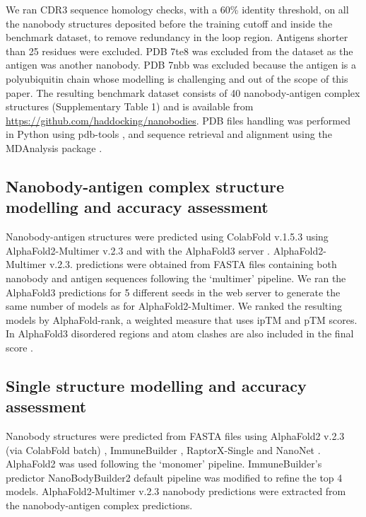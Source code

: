 \documentclass[12pt]{article}
\begin{document}
We ran CDR3 sequence homology checks, with a 60\% identity threshold, on all the nanobody structures deposited before the training cutoff and inside the benchmark dataset, to remove redundancy in the loop region. Antigens shorter than 25 residues were excluded. PDB 7te8 was excluded from the dataset as the antigen was another nanobody. PDB 7nbb was excluded because the antigen is a polyubiquitin chain whose modelling is challenging and out of the scope of this paper. The resulting benchmark dataset consists of 40 nanobody-antigen complex structures (Supplementary Table 1) and is available from \url{https://github.com/haddocking/nanobodies}. PDB files handling was performed in Python using pdb-tools \cite{rodrigues2018pdb}, and sequence retrieval and alignment using the MDAnalysis package \cite{gowers2019mdanalysis}.

\subsection{Nanobody-antigen complex structure modelling and accuracy assessment}

Nanobody-antigen structures were predicted using ColabFold v.1.5.3 using AlphaFold2-Multimer v.2.3 \cite{evans2021protein, mirdita2022colabfold} and with the AlphaFold3 server \cite{abramson2024accurate}. AlphaFold2-Multimer v.2.3. predictions were obtained from FASTA files containing both nanobody and antigen sequences following the ‘multimer’ pipeline. We ran the AlphaFold3 predictions for 5 different seeds in the web server to generate the same number of models as for AlphaFold2-Multimer. We ranked the resulting models by AlphaFold-rank, a weighted measure that uses ipTM and pTM scores. In AlphaFold3 disordered regions and atom clashes are also included in the final score \cite{abramson2024accurate}.

\subsection{Single structure modelling and accuracy assessment}

Nanobody structures were predicted from FASTA files using AlphaFold2 v.2.3 (via ColabFold batch) \cite{jumper2021highly, mirdita2022colabfold}, ImmuneBuilder \cite{abanades2023immunebuilder}, RaptorX-Single \cite{jing2024single} and NanoNet \cite{cohen2022nanonet}. AlphaFold2 was used following the ‘monomer’ pipeline. ImmuneBuilder’s predictor NanoBodyBuilder2 default pipeline was modified to refine the top 4 models. AlphaFold2-Multimer v.2.3 nanobody predictions were extracted from the nanobody-antigen complex predictions.
\end{document}
